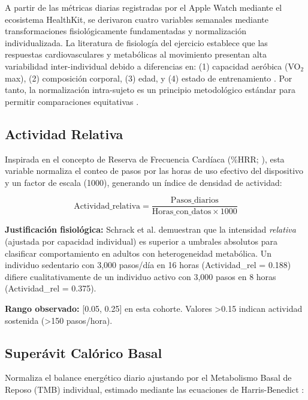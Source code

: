 A partir de las métricas diarias registradas por el Apple Watch mediante el ecosistema HealthKit, se derivaron cuatro variables semanales mediante transformaciones fisiológicamente fundamentadas y normalización individualizada. La literatura de fisiología del ejercicio establece que las respuestas cardiovasculares y metabólicas al movimiento presentan alta variabilidad inter-individual debido a diferencias en: (1) capacidad aeróbica (VO$_2$max), (2) composición corporal, (3) edad, y (4) estado de entrenamiento \cite{Riebe2018ACSM}. Por tanto, la normalización intra-sujeto es un principio metodológico estándar para permitir comparaciones equitativas \cite{Schrack2018,Ho2022}.

\subsection{Actividad Relativa}
\label{subsec:actividad_relativa}

Inspirada en el concepto de Reserva de Frecuencia Cardíaca (\%HRR; \cite{Schrack2018}), esta variable normaliza el conteo de pasos por las horas de uso efectivo del dispositivo y un factor de escala (1000), generando un índice de densidad de actividad:

\begin{equation}
\text{Actividad\_relativa} = \frac{\text{Pasos\_diarios}}{\text{Horas\_con\_datos} \times 1000}
\label{eq:actividad_relativa}
\end{equation}

\textbf{Justificación fisiológica:} Schrack et al. \cite{Schrack2018} demuestran que la intensidad \textit{relativa} (ajustada por capacidad individual) es superior a umbrales absolutos para clasificar comportamiento en adultos con heterogeneidad metabólica. Un individuo sedentario con 3,000 pasos/día en 16 horas (Actividad\_rel = 0.188) difiere cualitativamente de un individuo activo con 3,000 pasos en 8 horas (Actividad\_rel = 0.375).

\textbf{Rango observado:} [0.05, 0.25] en esta cohorte. Valores >0.15 indican actividad sostenida (>150 pasos/hora).

\subsection{Superávit Calórico Basal}
\label{subsec:superavit_calorico}

Normaliza el balance energético diario ajustando por el Metabolismo Basal de Reposo (TMB) individual, estimado mediante las ecuaciones de Harris-Benedict \cite{Harris1918}:

